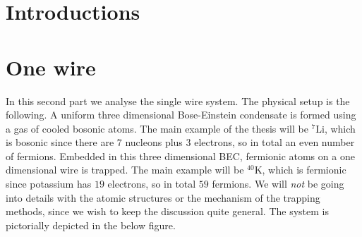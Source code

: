 \documentclass[11pt, twoside]{Thesis}
\begin{document}


\pagestyle{fancy} %

\tableofcontents %

\listoffigures %

\listoftables %


\mainmatter %

\pagestyle{fancy} %



\part{Introductions}
\newpage


 

\part{One wire}
In this second part we analyse the single wire system. The physical setup is the following. A uniform three dimensional Bose-Einstein condensate is formed using a gas of cooled bosonic atoms. The main example of the thesis will be $^{7}\text{Li}$, which is bosonic since there are $7$ nucleons plus $3$ electrons, so in total an even number of fermions. Embedded in this three dimensional BEC, fermionic atoms on a one dimensional wire is trapped. The main example will be $^{40}\text{K}$, which is fermionic since potassium has $19$ electrons, so in total $59$ fermions. We will \textit{not} be going into details with the atomic structures or the mechanism of the trapping methods, since we wish to keep the discussion quite general. The system is pictorially depicted in the below figure.
\end{document}
